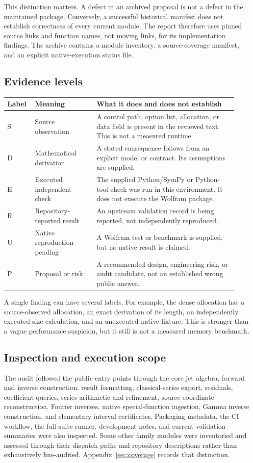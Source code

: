 \documentclass[11pt,a4paper]{article}
\newcommand{\code}[1]{\texttt{\detokenize{#1}}}
\begin{document}
This distinction matters. A defect in an archived proposal is not a defect
in the maintained package. Conversely, a successful historical manifest does
not establish correctness of every current module. The report therefore
uses pinned source links and function names, not moving \code{main} links,
for its implementation findings. The archive contains a module inventory,
a source-coverage manifest, and an explicit native-execution status file.

\subsection{Evidence levels}
\begin{longtable}{@{}P{0.10\linewidth}P{0.25\linewidth}P{0.58\linewidth}@{}}
\toprule
Label & Meaning & What it does and does not establish\\\midrule
\endhead
S & Source observation & A control path, option list, allocation, or data
field is present in the reviewed text. This is not a measured runtime.\\
D & Mathematical derivation & A stated consequence follows from an explicit
model or contract. Its assumptions are supplied.\\
E & Executed independent check & The supplied Python/SymPy or Python-tool
check was run in this environment. It does not execute the Wolfram package.\\
R & Repository-reported result & An upstream validation record is being
reported, not independently reproduced.\\
U & Native reproduction pending & A Wolfram test or benchmark is supplied,
but no native result is claimed.\\
P & Proposal or risk & A recommended design, engineering risk, or audit
candidate, not an established wrong public answer.\\
\bottomrule
\end{longtable}
A single finding can have several labels. For example, the dense allocation
has a source-observed allocation, an exact derivation of its length, an
independently executed size calculation, and an unexecuted native fixture.
This is stronger than a vague performance suspicion, but it still is not a
measured memory benchmark.

\subsection{Inspection and execution scope}
The audit followed the public entry points through the core jet algebra,
forward and inverse construction, result formatting, classical-series
export, residuals, coefficient queries, series arithmetic and refinement,
source-coordinate reconstruction, Fourier inverses, native special-function
ingestion, Gamma inverse construction, and elementary interval certificates.
Packaging metadata, the CI workflow, the full-suite runner, development
notes, and current validation summaries were also inspected. Some other
family modules were inventoried and assessed through their dispatch paths
and repository descriptions rather than exhaustively line-audited.
Appendix~\ref{sec:coverage} records that distinction.
\end{document}
